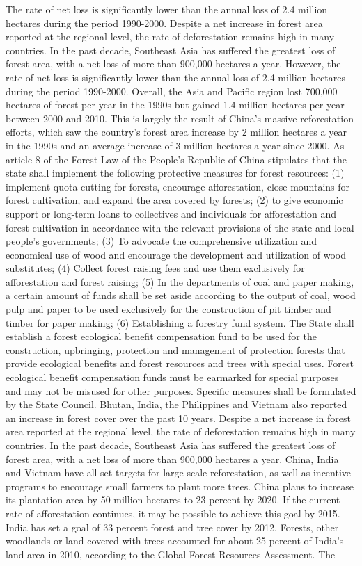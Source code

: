 \documentclass{book}\usepackage{knitr}
\begin{document}
\begin{knitrout}
\begin{kframe}
{	The rate of net loss is significantly lower than the annual loss of 2.4 million hectares during the period 1990-2000. Despite a net increase in forest area reported at the regional level, the rate of deforestation remains high in many countries. In the past decade, Southeast Asia has suffered the greatest loss of forest area, with a net loss of more than 900,000 hectares a year. However, the rate of net loss is significantly lower than the annual loss of 2.4 million hectares during the period 1990-2000. Overall, the Asia and Pacific region lost 700,000 hectares of forest per year in the 1990s but gained 1.4 million hectares per year between 2000 and 2010. This is largely the result of China's massive reforestation efforts, which saw the country's forest area increase by 2 million hectares a year in the 1990s and an average increase of 3 million hectares a year since 2000. As article 8 of the Forest Law of the People's Republic of China stipulates that the state shall implement the following protective measures for forest resources: (1) implement quota cutting for forests, encourage afforestation, close mountains for forest cultivation, and expand the area covered by forests; (2) to give economic support or long-term loans to collectives and individuals for afforestation and forest cultivation in accordance with the relevant provisions of the state and local people's governments; (3) To advocate the comprehensive utilization and economical use of wood and encourage the development and utilization of wood substitutes; (4) Collect forest raising fees and use them exclusively for afforestation and forest raising; (5) In the departments of coal and paper making, a certain amount of funds shall be set aside according to the output of coal, wood pulp and paper to be used exclusively for the construction of pit timber and timber for paper making; (6) Establishing a forestry fund system. The State shall establish a forest ecological benefit compensation fund to be used for the construction, upbringing, protection and management of protection forests that provide ecological benefits and forest resources and trees with special uses. Forest ecological benefit compensation funds must be earmarked for special purposes and may not be misused for other purposes. Specific measures shall be formulated by the State Council. Bhutan, India, the Philippines and Vietnam also reported an increase in forest cover over the past 10 years. Despite a net increase in forest area reported at the regional level, the rate of deforestation remains high in many countries. In the past decade, Southeast Asia has suffered the greatest loss of forest area, with a net loss of more than 900,000 hectares a year. China, India and Vietnam have all set targets for large-scale reforestation, as well as incentive programs to encourage small farmers to plant more trees. China plans to increase its plantation area by 50 million hectares to 23 percent by 2020. If the current rate of afforestation continues, it may be possible to achieve this goal by 2015. India has set a goal of 33 percent forest and tree cover by 2012. Forests, other woodlands or land covered with trees accounted for about 25 percent of India's land area in 2010, according to the Global Forest Resources Assessment. The }
\end{kframe}
\end{knitrout}
\end{document}
